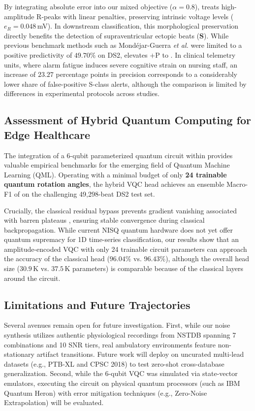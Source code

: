 By integrating absolute error into our mixed objective ($\alpha=0.8$), \HSL{} treats high-amplitude R-peaks with linear penalties, preserving intrinsic voltage levels ($e_R = 0.048$\,mV). In downstream classification, this morphological preservation directly benefits the detection of supraventricular ectopic beats ($\mathbf{S}$). While previous benchmark methods such as Mond{\'e}jar-Guerra \emph{et al.} \cite{mondejar2019} were limited to a positive predictivity of $49.70\%$ on DS2, \RRN{} elevates $+\mathrm{P}$ to . In clinical telemetry units, where alarm fatigue induces severe cognitive strain on nursing staff, an increase of $23.27$ percentage points in precision corresponds to a considerably lower share of false-positive S-class alerts, although the comparison is limited by differences in experimental protocols across studies.

\subsection{Assessment of Hybrid Quantum Computing for Edge Healthcare}
The integration of a 6-qubit parameterized quantum circuit within \RRN{} provides valuable empirical benchmarks for the emerging field of Quantum Machine Learning (QML). Operating with a minimal budget of only \textbf{24 trainable quantum rotation angles}, the hybrid VQC head achieves an ensemble Macro-F1 of  on the challenging 49{,}298-beat DS2 test set. 

Crucially, the classical residual bypass prevents gradient vanishing associated with barren plateaus \cite{mcclean2018}, ensuring stable convergence during classical backpropagation. While current NISQ quantum hardware does not yet offer quantum supremacy for 1D time-series classification, our results show that an amplitude-encoded VQC with only 24 trainable circuit parameters can approach the accuracy of the classical head ($96.04\%$ vs. $96.43\%$), although the overall head size ($30.9$\,K vs. $37.5$\,K parameters) is comparable because of the classical layers around the circuit.

\subsection{Limitations and Future Trajectories}
Several avenues remain open for future investigation. First, while our noise synthesis utilizes authentic physiological recordings from NSTDB spanning 7 combinations and 10 SNR tiers, real ambulatory environments feature non-stationary artifact transitions. Future work will deploy \HSL{} on uncurated multi-lead datasets (e.g., PTB-XL and CPSC 2018) to test zero-shot cross-database generalization. Second, while the 6-qubit VQC was simulated via state-vector emulators, executing the circuit on physical quantum processors (such as IBM Quantum Heron) with error mitigation techniques (e.g., Zero-Noise Extrapolation) will be evaluated.
